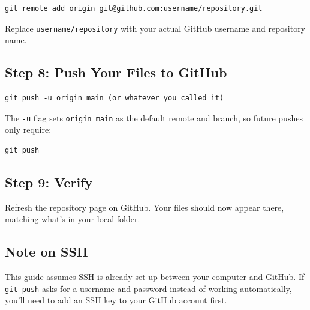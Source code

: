 \documentclass[main.tex]{subfiles}
\begin{document}
\begin{lstlisting}
git remote add origin git@github.com:username/repository.git
\end{lstlisting}

Replace \texttt{username/repository} with your actual GitHub
username and repository name.

\subsection{Step 8: Push Your Files to GitHub}
\begin{lstlisting}
git push -u origin main (or whatever you called it)
\end{lstlisting}

The \texttt{-u} flag sets \texttt{origin main} as the default
remote and branch, so future pushes only require:

\begin{lstlisting}
git push
\end{lstlisting}

\subsection{Step 9: Verify}
Refresh the repository page on GitHub. Your files should now
appear there, matching what's in your local folder.

\subsection{Note on SSH}
This guide assumes SSH is already set up between your computer
and GitHub. If \texttt{git push} asks for a username and password
instead of working automatically, you'll need to add an SSH key
to your GitHub account first.
\end{document}
